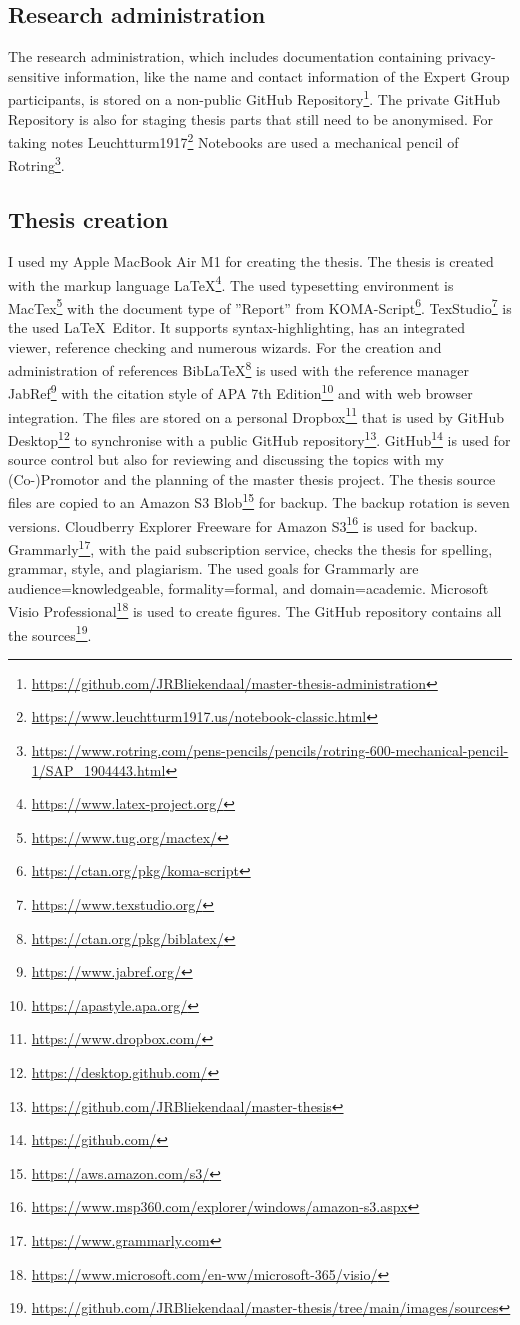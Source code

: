 \subsection{Research administration}
\label{sub:tbresearchadministration}
The research administration, which includes documentation containing privacy-sensitive information, like the name and contact information of the Expert Group participants, is stored on a non-public GitHub Repository\footnote{\url{https://github.com/JRBliekendaal/master-thesis-administration}}. The private GitHub Repository is also for staging thesis parts that still need to be anonymised. For taking notes Leuchtturm1917\footnote{\url{https://www.leuchtturm1917.us/notebook-classic.html}} Notebooks are used a mechanical pencil of Rotring\footnote{\url{https://www.rotring.com/pens-pencils/pencils/rotring-600-mechanical-pencil-1/SAP_1904443.html}}.
\subsection{Thesis creation}
\label{sub:tbresearchcreation}
I used my Apple MacBook Air M1 for creating the thesis. The thesis is created with the markup language \LaTeX\footnote{\url{https://www.latex-project.org/}}. The used typesetting environment is MacTex\footnote{\url{https://www.tug.org/mactex/}} with the document type of ''Report'' from KOMA-Script\footnote{\url{https://ctan.org/pkg/koma-script}}. TexStudio\footnote{\url{https://www.texstudio.org/}} is the used \LaTeX\ Editor. It supports syntax-highlighting, has an integrated viewer, reference checking and numerous wizards. For the creation and administration of references Bib\LaTeX\footnote{\url{https://ctan.org/pkg/biblatex/}} is used with the reference manager JabRef\footnote{\url{https://www.jabref.org/}} with the citation style of APA 7th Edition\footnote{\url{https://apastyle.apa.org/}} and with web browser integration. The files are stored on a personal Dropbox\footnote{\url{https://www.dropbox.com/}} that is used by GitHub Desktop\footnote{\url{https://desktop.github.com/}} to synchronise with a public GitHub repository\footnote{\url{https://github.com/JRBliekendaal/master-thesis}}. GitHub\footnote{\url{https://github.com/}} is used for source control but also for reviewing and discussing the topics with my (Co-)Promotor and the planning of the master thesis project. The thesis source files are copied to an Amazon S3 Blob\footnote{\url{https://aws.amazon.com/s3/}} for backup. The backup rotation is seven versions. Cloudberry Explorer Freeware for Amazon S3\footnote{\url{https://www.msp360.com/explorer/windows/amazon-s3.aspx}} is used for backup. Grammarly\footnote{\url{https://www.grammarly.com}}, with the paid subscription service, checks the thesis for spelling, grammar,  style, and plagiarism. The used goals for Grammarly are audience=knowledgeable, formality=formal, and domain=academic. Microsoft Visio Professional\footnote{\url{https://www.microsoft.com/en-ww/microsoft-365/visio/}} is used to create figures. The GitHub repository contains all the sources\footnote{\url{https://github.com/JRBliekendaal/master-thesis/tree/main/images/sources}}.
